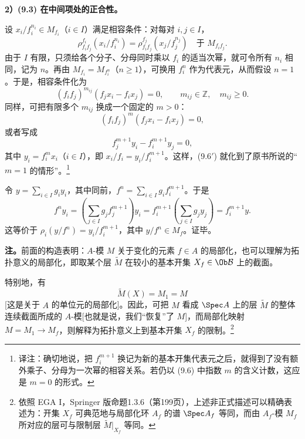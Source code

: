\textbf{2）(9.3) 在中间项处的正合性。}

设 $x_i/f_i^{n_i}\in M_{f_i}$（$i\in I$）满足相容条件：对每对 $i,j\in I$，
\begin{equation}\tag{9.5}
\rho^{f_i}_{f_if_j}(x_i/f_i^{n_i})
=\rho^{f_j}_{f_if_j}(x_j/f_j^{n_j})\quad\text{于 }M_{f_if_j}.
\end{equation}
由于 $I$ 有限，只须给各个分子、分母同时乘以 $f_i$ 的适当次幂，就可令所有 $n_i$ 相同，记为 $n$。再由 $M_{f_i}=M_{f_i^n}$（$n\ge1$），可换用 $f_i^n$ 作为代表元，从而假设 $n=1$。于是，相容条件化为
\begin{equation}\tag{9.6}
(f_if_j)^{m_{ij}}(f_jx_i-f_ix_j)=0,
\qquad m_{ij}\in\mathbb Z,\quad m_{ij}\ge0.
\end{equation}
同样，可把有限多个 $m_{ij}$ 换成一个固定的 $m>0$：
\begin{equation}\tag{9.6$'$}
(f_if_j)^m(f_jx_i-f_ix_j)=0,
\end{equation}
或者写成
\begin{equation}\tag{9.6$''$}
f_j^{m+1}y_i-f_i^{m+1}y_j=0,
\end{equation}
其中 $y_i=f_i^mx_i$（$i\in I$），即 $x_i/f_i=y_i/f_i^{m+1}$。这样，(9.6$'$) 就化到了原书所说的“$m=1$ 的情形”。\footnote{译注：确切地说，把 $f_i^{m+1}$ 换记为新的基本开集代表元之后，就得到了没有额外乘子、分母为一次幂的相容关系。若仍以 (9.6) 中指数 $m$ 的含义计数，这应是 $m=0$ 的形式。}

令 $y=\sum_{i\in I}g_iy_i$，其中同前，$f^n=\sum_{i\in I}g_if_i^{m+1}$。于是
\begin{equation}\tag{9.7}
f^ny_i=
\left(\sum_{j\in I}g_jf_j^{m+1}\right)y_i
=f_i^{m+1}\left(\sum_{j\in I}g_jy_j\right)
=f_i^{m+1}y.
\end{equation}
这等价于 $\rho_i(y/f^n)=y_i/f_i^{m+1}$，其中 $y/f^n\in M_f$。证毕。

\textbf{注。}前面的构造表明：$A$-模 $M$ 关于变化的元素 $f\in A$ 的局部化，也可以理解为拓扑意义的局部化，即取某个层 $\widetilde M$ 在较小的基本开集 $X_f\in\Ob\mathcal B$ 上的截面。

特别地，有
\begin{equation}\tag{9.8}
\widetilde M(X)=M_1=M
\end{equation}
[这是关于 $A$ 的单位元的局部化]。因此，可把 $M$ 看成 $\Spec A$ 上的层 $\widetilde M$ 的整体连续截面所成的 $A$-模[也就是说，我们“恢复”了 $M$]，而局部化映射
$M=M_1\to M_f$，则解释为拓扑意义上到基本开集 $X_f$ 的限制。\footnote{依照 EGA I，Springer 版命题1.3.6（第199页），上述非正式描述可以精确表述为：开集 $X_f$ 可典范地与局部化环 $A_f$ 的谱 $\Spec A_f$ 等同，而由 $A_f$-模 $M_f$ 所对应的层可与限制层 $\widetilde M|_{X_f}$ 等同。}

